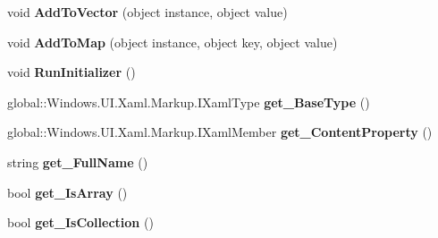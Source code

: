 \begin{DoxyCompactItemize}
void {\bfseries Add\+To\+Vector} (object instance, object value)
\item 
\mbox{\label{interface_windows_1_1_u_i_1_1_xaml_1_1_markup_1_1_i_xaml_type_ab81b106f354f661a28e2fe7c1cf529fb}} 
void {\bfseries Add\+To\+Map} (object instance, object key, object value)
\item 
\mbox{\label{interface_windows_1_1_u_i_1_1_xaml_1_1_markup_1_1_i_xaml_type_a43defd106c74e1f61c00f36498126028}} 
void {\bfseries Run\+Initializer} ()
\item 
\mbox{\label{interface_windows_1_1_u_i_1_1_xaml_1_1_markup_1_1_i_xaml_type_a25118da9dba36c6dcde8724ccbe078b0}} 
global\+::\+Windows.\+U\+I.\+Xaml.\+Markup.\+I\+Xaml\+Type {\bfseries get\+\_\+\+Base\+Type} ()
\item 
\mbox{\label{interface_windows_1_1_u_i_1_1_xaml_1_1_markup_1_1_i_xaml_type_aa0f823851084ebadb94e1bc55468b1dc}} 
global\+::\+Windows.\+U\+I.\+Xaml.\+Markup.\+I\+Xaml\+Member {\bfseries get\+\_\+\+Content\+Property} ()
\item 
\mbox{\label{interface_windows_1_1_u_i_1_1_xaml_1_1_markup_1_1_i_xaml_type_a5c1dd332e5b51cd2bb878fc56640a7a8}} 
string {\bfseries get\+\_\+\+Full\+Name} ()
\item 
\mbox{\label{interface_windows_1_1_u_i_1_1_xaml_1_1_markup_1_1_i_xaml_type_a16b5c5eaeeaad7ca4f010931852df7e4}} 
bool {\bfseries get\+\_\+\+Is\+Array} ()
\item 
\mbox{\label{interface_windows_1_1_u_i_1_1_xaml_1_1_markup_1_1_i_xaml_type_a979e0b0e073ddfb9b26002ca80cd7af7}} 
bool {\bfseries get\+\_\+\+Is\+Collection} ()
\item 
\mbox{\label{interface_windows_1_1_u_i_1_1_xaml_1_1_markup_1_1_i_xaml_type_a36b2295d77f635d1f86673a460235f92}} 

\end{DoxyCompactItemize}
